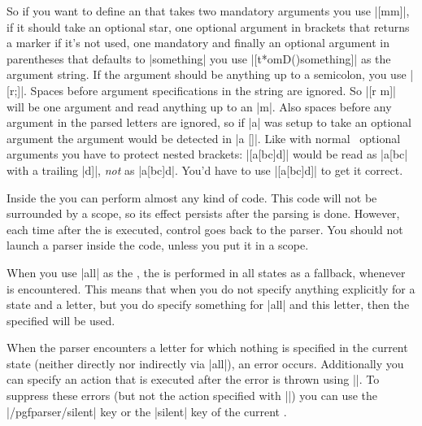 \begin{command}
  So if you want to define an  that takes two mandatory arguments
  you use |[mm]|, if it should take an optional star, one optional argument in
  brackets that returns a marker if it's not used, one mandatory and finally an
  optional argument in parentheses that defaults to |something| you use
  |[t*omD(){something}]| as the argument string. If the argument should be
  anything up to a semicolon, you use |[r;]|. Spaces before argument
  specifications in the string are ignored. So |[r m]| will be one argument and
  read anything up to an |m|. Also spaces before any argument in the parsed
  letters are ignored, so if |a| was setup to take an optional argument the
  argument would be detected in |a []|. Like with normal \LaTeXe\ optional
  arguments you have to protect nested brackets: |[a[bc]d]| would be read as
  |a[bc| with a trailing |d]|, \emph{not} as |a[bc]d|. You'd have to use
  |[{a[bc]d}]| to get it correct.

  Inside the  you can perform almost any kind of code. This code
  will not be surrounded by a scope, so its effect persists after the parsing
  is done. However, each time after the  is executed, control
  goes back to the parser. You should not launch a parser inside the
   code, unless you put it in a scope.

  When you use |all| as the , the  is performed
  in all states as a fallback, whenever  is encountered.
  This means that when you do not specify anything explicitly for a state and a
  letter, but you do specify something for |all| and this letter, then the
  specified  will be used.

  When the parser encounters a letter for which nothing is specified in the
  current state (neither directly nor indirectly via |all|), an error occurs.
  Additionally you can specify an action that is executed after the error is
  thrown using |\pgfparserdefunknown|. To suppress these errors (but not the
  action specified with |\pgfparserdefunknown|) you can use the
  |/pgfparser/silent| key or the |silent| key of the current .
\end{command}%

